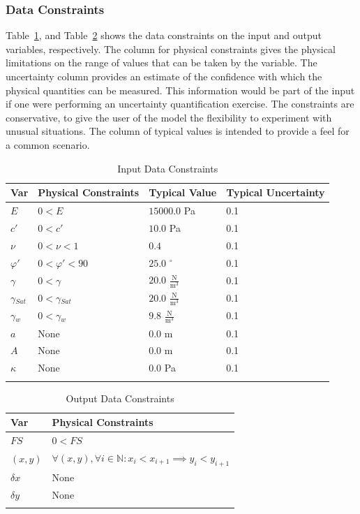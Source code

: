 \documentclass[12pt]{article}
\begin{document}
\subsubsection{Data Constraints}
\label{Sec:DataCons}
Table~\ref{Table:InpuDataCons}, and Table~\ref{Table:OutpDataCons} shows the data constraints on the input and output variables, respectively. The column for physical constraints gives the physical limitations on the range of values that can be taken by the variable. The uncertainty column provides an estimate of the confidence with which the physical quantities can be measured. This information would be part of the input if one were performing an uncertainty quantification exercise. The constraints are conservative, to give the user of the model the flexibility to experiment with unusual situations. The column of typical values is intended to provide a feel for a common scenario.
\begin{longtable}{l l l l}
\toprule
Var & Physical Constraints & Typical Value & Typical Uncertainty
\\
\midrule
$E$ & $0<E$ & $15000.0$ Pa & 0.1
\\
$c'$ & $0<c'$ & $10.0$ Pa & 0.1
\\
$\nu{}$ & $0<\nu{}<1$ & $0.4$ & 0.1
\\
$\varphi{}'$ & $0<\varphi{}'<90$ & $25.0$ ${}^{\circ}$ & 0.1
\\
$\gamma{}$ & $0<\gamma{}$ & $20.0$ $\frac{\text{N}}{\text{m}^{3}}$ & 0.1
\\
$\gamma{}_{Sat}$ & $0<\gamma{}_{Sat}$ & $20.0$ $\frac{\text{N}}{\text{m}^{3}}$ & 0.1
\\
$\gamma{}_{w}$ & $0<\gamma{}_{w}$ & $9.8$ $\frac{\text{N}}{\text{m}^{3}}$ & 0.1
\\
$a$ & None & $0.0$ m & 0.1
\\
$A$ & None & $0.0$ m & 0.1
\\
$\kappa{}$ & None & $0.0$ Pa & 0.1
\\
\bottomrule
\caption{Input Data Constraints}
\label{Table:InpuDataCons}
\end{longtable}
\begin{longtable}{l l}
\toprule
Var & Physical Constraints
\\
\midrule
$FS$ & $0<FS$
\\
$(x,y)$ & $\forall{}(x,y), \forall{}i\in{}\mathbb{N}: x_{i}<x_{i+1}\implies{}y_{i}<y_{i+1}$
\\
$\delta{}x$ & None
\\
$\delta{}y$ & None
\\
\bottomrule
\caption{Output Data Constraints}
\label{Table:OutpDataCons}
\end{longtable}
\end{document}

